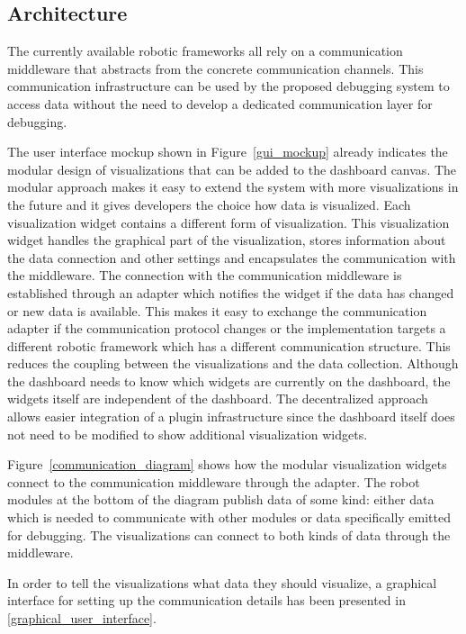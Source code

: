 
\subsection{Architecture}
The currently available robotic frameworks all rely on a communication middleware that abstracts from the concrete communication channels. This communication infrastructure can be used by the proposed debugging system to access data without the need to develop a dedicated communication layer for debugging.

The user interface mockup shown in Figure~\ref{gui_mockup} already indicates the modular design of visualizations that can be added to the dashboard canvas. The modular approach makes it easy to extend the system with more visualizations in the future and it gives developers the choice how data is visualized. Each visualization widget contains a different form of visualization. This visualization widget handles the graphical part of the visualization, stores information about the data connection and other settings and encapsulates the communication with the middleware. The connection with the communication middleware is established through an adapter which notifies the widget if the data has changed or new data is available. This makes it easy to exchange the communication adapter if the communication protocol changes or the implementation targets a different robotic framework which has a different communication structure. This reduces the coupling between the visualizations and the data collection. Although the dashboard needs to know which widgets are currently on the dashboard, the widgets itself are independent of the dashboard. The decentralized approach allows easier integration of a plugin infrastructure since the dashboard itself does not need to be modified to show additional visualization widgets.

Figure~\ref{communication_diagram} shows how the modular visualization widgets connect to the communication middleware through the adapter. The robot modules at the bottom of the diagram publish data of some kind: either data which is needed to communicate with other modules or data specifically emitted for debugging. The visualizations can connect to both kinds of data through the middleware.

\q In order to tell the visualizations what data they should visualize, a graphical interface for setting up the communication details has been presented in \ref{graphical_user_interface}. \q
{}

